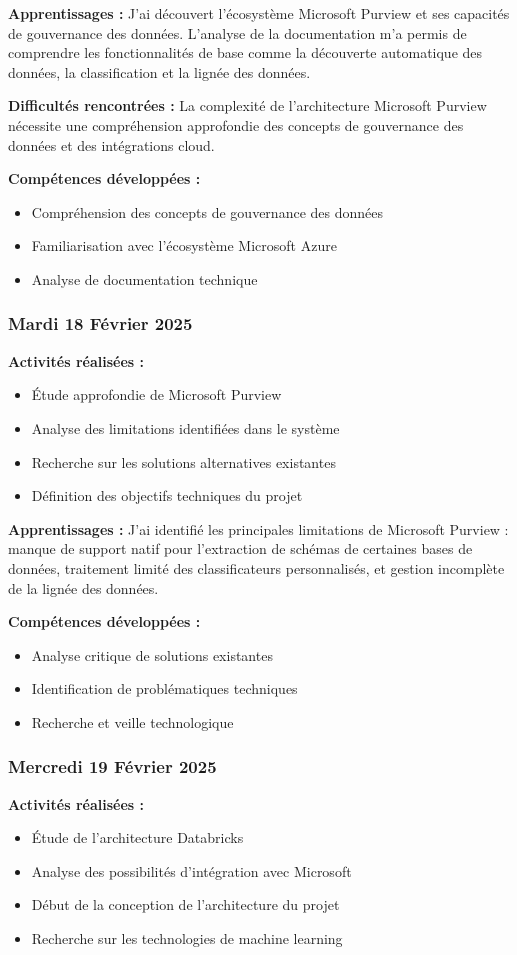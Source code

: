 \documentclass[12pt,a4paper]{article}
\begin{document}
\textbf{Apprentissages :}
J'ai découvert l'écosystème Microsoft Purview et ses capacités de gouvernance des données. L'analyse de la documentation m'a permis de comprendre les fonctionnalités de base comme la découverte automatique des données, la classification et la lignée des données.

\textbf{Difficultés rencontrées :}
La complexité de l'architecture Microsoft Purview nécessite une compréhension approfondie des concepts de gouvernance des données et des intégrations cloud.

\textbf{Compétences développées :}
\begin{itemize}
    \item Compréhension des concepts de gouvernance des données
    \item Familiarisation avec l'écosystème Microsoft Azure
    \item Analyse de documentation technique
\end{itemize}

\subsubsection{Mardi 18 Février 2025}
\textbf{Activités réalisées :}
\begin{itemize}
    \item Étude approfondie de Microsoft Purview
    \item Analyse des limitations identifiées dans le système
    \item Recherche sur les solutions alternatives existantes
    \item Définition des objectifs techniques du projet
\end{itemize}

\textbf{Apprentissages :}
J'ai identifié les principales limitations de Microsoft Purview : manque de support natif pour l'extraction de schémas de certaines bases de données, traitement limité des classificateurs personnalisés, et gestion incomplète de la lignée des données.

\textbf{Compétences développées :}
\begin{itemize}
    \item Analyse critique de solutions existantes
    \item Identification de problématiques techniques
    \item Recherche et veille technologique
\end{itemize}

\subsubsection{Mercredi 19 Février 2025}
\textbf{Activités réalisées :}
\begin{itemize}
    \item Étude de l'architecture Databricks
    \item Analyse des possibilités d'intégration avec Microsoft
    \item Début de la conception de l'architecture du projet
    \item Recherche sur les technologies de machine learning
\end{itemize}
\end{document}
